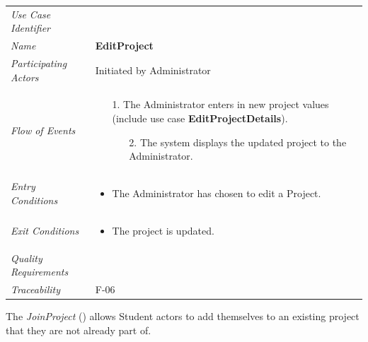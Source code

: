 \documentclass[12pt,letterpaper]{article}
\begin{document}
\begin{center}
	\begin{tabu} to 
		\toprule
		Use Case Identifier & \editproject{} \\
		Name & {\bf EditProject} \\
		Participating Actors & Initiated by Administrator \\
		Flow of Events & 
		\begin{minipage}[t]{\linewidth}
		    \begin{enumerate}
		        \item[1.] The Administrator enters in new project values (include use case \textbf{EditProjectDetails}).
			    \begin{enumerate}
			        \item[2.] The system displays the updated project to the Administrator.
			    \end{enumerate}
			\end{enumerate}
		\end{minipage} \\

		Entry Conditions &
		\begin{minipage}[t]{\linewidth}
			\begin{itemize}
			    \item The Administrator has chosen to edit a Project.
	        \end{itemize}
		\end{minipage} \\

		Exit Conditions &
        \begin{minipage}[t]{\linewidth}
			\begin{itemize}
			    \item The project is updated.
	        \end{itemize}
		\end{minipage} \\

		Quality Requirements & \\

		Traceability & F-06 \\
		\toprule
	\end{tabu}
\end{center}

\newpage{}

The {\it JoinProject} ({\bf \joinproject{}}) allows Student actors to add themselves to an existing project that they are not already part of.
\end{document}
